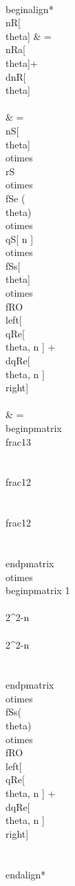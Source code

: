 \\begin{align*}
\\nR[\\theta] & = \\nRa[\\theta]+\\dnR[\\theta] \\\\
& = \\nS[\\theta] \\otimes \\rS \\otimes \\fSe (\\theta) \\otimes\\qS[ n ] \\otimes \\fSs[\\theta]  \\otimes \\fRO \\left[ \\qRe[ \\theta, n ]  + \\dqRe[ \\theta, n ]  \\right]  \\\\
& = 
\\begin{pmatrix}
 \\frac{1}{3}  \\\\
 \\frac{1}{2}\\\\
 \\frac{1}{2} \\\\
\\end{pmatrix}
 \\otimes
\\begin{pmatrix}
 1  \\\\
 2^{2-n } \\\\
 2^{2-n }  \\\\
\\end{pmatrix}
\\otimes  \\fSs(\\theta) \\otimes \\fRO \\left[ \\qRe[ \\theta, n ]  + \\dqRe[ \\theta, n ]  \\right]   \\\\
\\end{align*}


